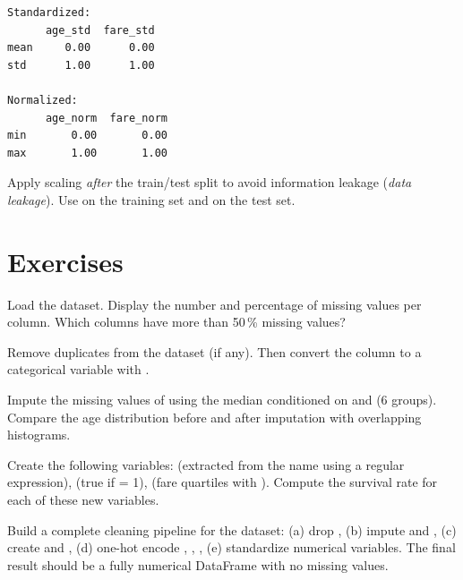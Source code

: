 \begin{codeoutput}
\begin{verbatim}
Standardized:
      age_std  fare_std
mean     0.00      0.00
std      1.00      1.00

Normalized:
      age_norm  fare_norm
min       0.00       0.00
max       1.00       1.00
\end{verbatim}
\end{codeoutput}

\begin{bestpractice}
Apply scaling \emph{after} the train/test split to avoid information leakage (\emph{data leakage}). Use  on the training set and  on the test set.
\end{bestpractice}

\section{Exercises}

\begin{exercise}[$\star$]
Load the  dataset. Display the number and percentage of missing values per column. Which columns have more than 50\,\% missing values?
\end{exercise}

\begin{exercise}[$\star$]
Remove duplicates from the  dataset (if any). Then convert the  column to a categorical variable with .
\end{exercise}

\begin{exercise}[$\star\star$]
Impute the missing values of  using the median conditioned on  and  (6 groups). Compare the age distribution before and after imputation with overlapping histograms.
\end{exercise}

\begin{exercise}[$\star\star$]
Create the following variables:  (extracted from the name using a regular expression),  (true if  = 1),  (fare quartiles with ). Compute the survival rate for each of these new variables.
\end{exercise}

\begin{exercise}[$\star\star\star$]
Build a complete cleaning pipeline for the  dataset: (a) drop , (b) impute  and , (c) create  and , (d) one-hot encode , , , (e) standardize numerical variables. The final result should be a fully numerical DataFrame with no missing values.
\end{exercise}

